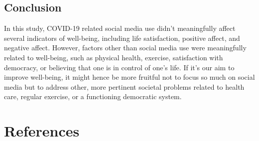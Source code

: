 \documentclass[
  english,
  man,mask,floatsintext]{apa6}
\begin{document}
\hypertarget{conclusion}{%
\subsection{Conclusion}\label{conclusion}}

In this study, COVID-19 related social media use didn't meaningfully affect several indicators of well-being, including life satisfaction, positive affect, and negative affect.
However, factors other than social media use were meaningfully related to well-being, such as physical health, exercise, satisfaction with democracy, or believing that one is in control of one's life.
If it's our aim to improve well-being, it might hence be more fruitful not to focus so much on social media but to address other, more pertinent societal problems related to health care, regular exercise, or a functioning democratic system.

\newpage

\hypertarget{references}{%
\section{References}\label{references}}
\end{document}
